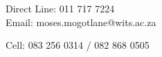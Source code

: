 






\begin{no}




Direct Line: 011 717 7224\\
Email: moses.mogotlane@wits.ac.za

\divider




\begin{no}
Cell: 083 256 0314 / 082 868 0505\\
\end{no}

\end{no}

